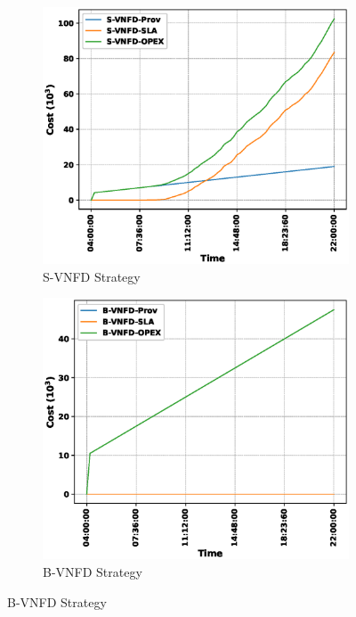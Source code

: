 \documentclass[conference, final]{IEEEtran}
\begin{document}
{\begin{figure}
\begin{subfigure}[h]{0.32\linewidth}
\includegraphics[width=\linewidth]{./figures/S-VNFDcost_trace.eps}
\caption{{\textsf{S-VNFD}} Strategy}
\end{subfigure}
\hfill
\begin{subfigure}[h]{0.32\linewidth}
\includegraphics[width=\linewidth]{./figures/B-VNFDcost_trace.eps}
\caption{{\textsf{B-VNFD}} Strategy}
\end{subfigure}

\end{figure}}
\end{document}
